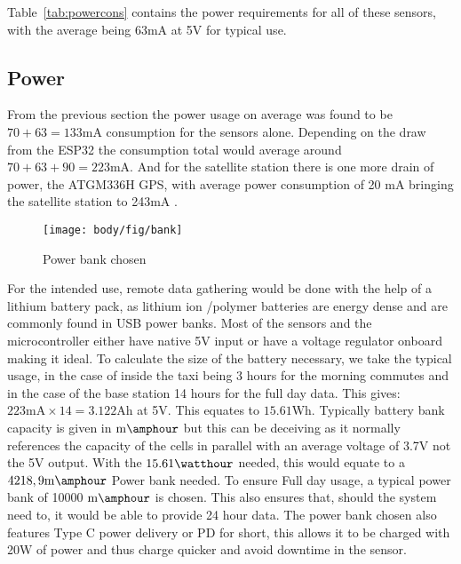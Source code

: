 \noindent Table~\ref{tab:powercons} \cite{sen55} contains the power requirements for all of these sensors, with the average being 63mA at 5V for typical use.

\subsection{Power}
From the previous section the power usage on average was found to be $ 70 +  63 = 133\si{\milli\ampere}$ consumption for the sensors alone. Depending on the draw from the ESP32 the consumption total would average around $ 70 +  63 + 90 = 223\si{\milli\ampere}$\cite{wifiespnow}.
And for the satellite station there is one more drain of power, the ATGM336H GPS, with average power consumption of 20 mA\cite{atgm336h} bringing the satellite station to 243mA .
%

\begin{figure}[!htb]
	\centering
	\texttt{[image: body/fig/bank]}
	\caption{Power bank chosen}
	\label{fig:bank}
\end{figure}


\noindent
For the intended use, remote data gathering would be done with the help of a lithium battery pack, as lithium ion /polymer batteries are energy dense and are commonly found in USB power banks. Most of the sensors and the microcontroller either have native 5V input or have a voltage regulator onboard making it ideal. To calculate the size of the battery necessary, we take the typical usage, in the case of inside the taxi being 3 hours for the morning commutes and in the case of the base station 14 hours for the full day data. This gives: $223\si{\milli\ampere} \times 14 = 3.122 \si{\ampere\hour} $ at 5V. This equates to $15.61 \si{\watt\hour}$. Typically battery bank capacity is given in $ \si{\milli\amphour} $ but this can be deceiving as it normally references the capacity of the cells in parallel with an average voltage of 3.7V not the 5V output. With the $15.61 \si{\watthour}$ needed, this would equate to a  $ 4218,9\si{\milli\amphour} $ Power bank needed. To ensure Full day usage, a typical power bank of 10000 $ \si{\milli\amphour} $ is chosen. This also ensures that, should the system need to, it would be able to provide 24 hour data.
The power bank chosen also features Type C power delivery or PD for short, this allows it to be charged with 20$ \si{\watt} $ of power and thus charge quicker and avoid downtime in the sensor.


